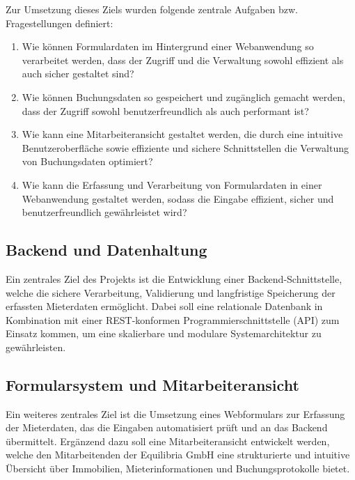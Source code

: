 Zur Umsetzung dieses Ziels wurden folgende zentrale Aufgaben bzw. Fragestellungen definiert:

\begin{enumerate}
    \item Wie können Formulardaten im Hintergrund einer Webanwendung so verarbeitet werden, dass der Zugriff und die Verwaltung sowohl effizient als auch sicher gestaltet sind?
    \item Wie können Buchungsdaten so gespeichert und zugänglich gemacht werden, dass der Zugriff sowohl benutzerfreundlich als auch performant ist?
    \item Wie kann eine Mitarbeiteransicht gestaltet werden, die durch eine intuitive Benutzeroberfläche sowie effiziente und sichere Schnittstellen die Verwaltung von Buchungsdaten optimiert?
    \item Wie kann die Erfassung und Verarbeitung von Formulardaten in einer Webanwendung gestaltet werden, sodass die Eingabe effizient, sicher und benutzerfreundlich gewährleistet wird?
\end{enumerate}

\subsection{Backend und Datenhaltung}

Ein zentrales Ziel des Projekts ist die Entwicklung einer Backend-Schnittstelle, welche die sichere Verarbeitung, Validierung und langfristige Speicherung der erfassten Mieterdaten ermöglicht. Dabei soll eine relationale Datenbank in Kombination mit einer REST-konformen Programmierschnittstelle (API) zum Einsatz kommen, um eine skalierbare und modulare Systemarchitektur zu gewährleisten.

\subsection{Formularsystem und Mitarbeiteransicht}

Ein weiteres zentrales Ziel ist die Umsetzung eines Webformulars zur Erfassung der Mieterdaten, das die Eingaben automatisiert prüft und an das Backend übermittelt. Ergänzend dazu soll eine Mitarbeiteransicht entwickelt werden, welche den Mitarbeitenden der Equilibria GmbH eine strukturierte und intuitive Übersicht über Immobilien, Mieterinformationen und Buchungsprotokolle bietet. \cite{prompt-gpt-write-einleitung}

